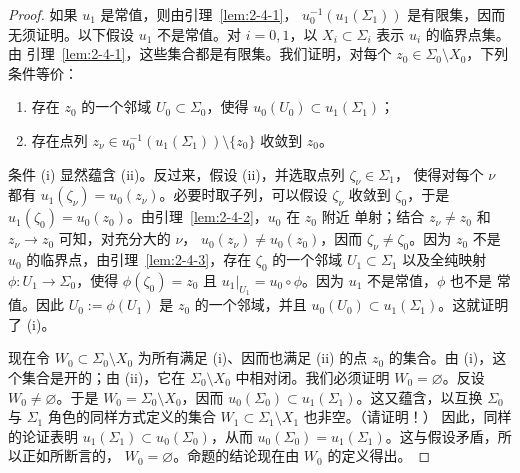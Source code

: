 \begin{proof}
如果 $u_1$ 是常值，则由引理~\ref{lem:2-4-1}，
$u_0^{-1}(u_1(\Sigma_1))$ 是有限集，因而无须证明。以下假设 $u_1$ 不是常值。对
$i=0,1$，以 $X_i\subset\Sigma_i$ 表示 $u_i$ 的临界点集。由
引理~\ref{lem:2-4-1}，这些集合都是有限集。我们证明，对每个
$z_0\in\Sigma_0\setminus X_0$，下列条件等价：
\begin{enumerate}[label=(\roman*),leftmargin=3em]
  \item 存在 $z_0$ 的一个邻域 $U_0\subset\Sigma_0$，使得
    $u_0(U_0)\subset u_1(\Sigma_1)$；
  \item 存在点列
    $z_\nu\in u_0^{-1}(u_1(\Sigma_1))\setminus\{z_0\}$ 收敛到 $z_0$。
\end{enumerate}
条件 (i) 显然蕴含 (ii)。反过来，假设 (ii)，并选取点列 $\zeta_\nu\in\Sigma_1$，
使得对每个 $\nu$ 都有 $u_1(\zeta_\nu)=u_0(z_\nu)$。必要时取子列，可以假设
$\zeta_\nu$ 收敛到 $\zeta_0$，于是
$u_1(\zeta_0)=u_0(z_0)$。由引理~\ref{lem:2-4-2}，$u_0$ 在 $z_0$ 附近
单射；结合
$z_\nu\ne z_0$ 和 $z_\nu\to z_0$ 可知，对充分大的 $\nu$，
$u_0(z_\nu)\ne u_0(z_0)$，因而 $\zeta_\nu\ne\zeta_0$。因为 $z_0$
不是 $u_0$ 的临界点，由引理~\ref{lem:2-4-3}，存在 $\zeta_0$ 的一个邻域
$U_1\subset\Sigma_1$ 以及全纯映射 $\phi:U_1\to\Sigma_0$，使得
$\phi(\zeta_0)=z_0$ 且 $u_1|_{U_1}=u_0\circ\phi$。因为 $u_1$ 不是常值，$\phi$ 也不是
常值。因此 $U_0:=\phi(U_1)$ 是 $z_0$ 的一个邻域，并且
$u_0(U_0)\subset u_1(\Sigma_1)$。这就证明了 (i)。

现在令 $W_0\subset\Sigma_0\setminus X_0$ 为所有满足 (i)、因而也满足 (ii) 的点
$z_0$ 的集合。由 (i)，这个集合是开的；由 (ii)，它在
$\Sigma_0\setminus X_0$ 中相对闭。我们必须证明 $W_0=\varnothing$。反设
$W_0\ne\varnothing$。于是 $W_0=\Sigma_0\setminus X_0$，因而
$u_0(\Sigma_0)\subset u_1(\Sigma_1)$。这又蕴含，以互换 $\Sigma_0$ 与 $\Sigma_1$
角色的同样方式定义的集合 $W_1\subset\Sigma_1\setminus X_1$ 也非空。（请证明！）
因此，同样的论证表明 $u_1(\Sigma_1)\subset u_0(\Sigma_0)$，从而
$u_0(\Sigma_0)=u_1(\Sigma_1)$。这与假设矛盾，所以正如所断言的，
$W_0=\varnothing$。命题的结论现在由 $W_0$ 的定义得出。
\end{proof}
